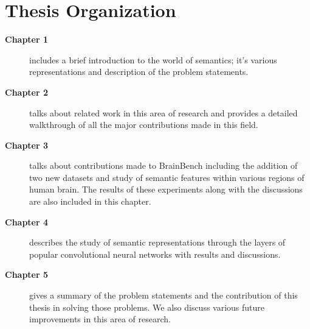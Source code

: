 









\section{Thesis Organization}

\begin{description}
\item[\textbf{Chapter 1}] includes a brief introduction to the world of semantics; it's various representations and description of the problem statements.
\item[\textbf{Chapter 2}] talks about related work in this area of research and provides a detailed walkthrough of all the major contributions made in this field. 
\item[\textbf{Chapter 3}] talks about contributions made to BrainBench including the addition of two new datasets and study of semantic features within various regions of human brain. The results of these experiments along with the discussions are also included in this chapter.
\item[\textbf{Chapter 4}] describes the study of semantic representations through the layers of popular convolutional neural networks with results and discussions.
\item[\textbf{Chapter 5}] gives a summary of the problem statements and the contribution of this thesis in solving those problems. We also discuss various future improvements in this area of research.
\end{description}